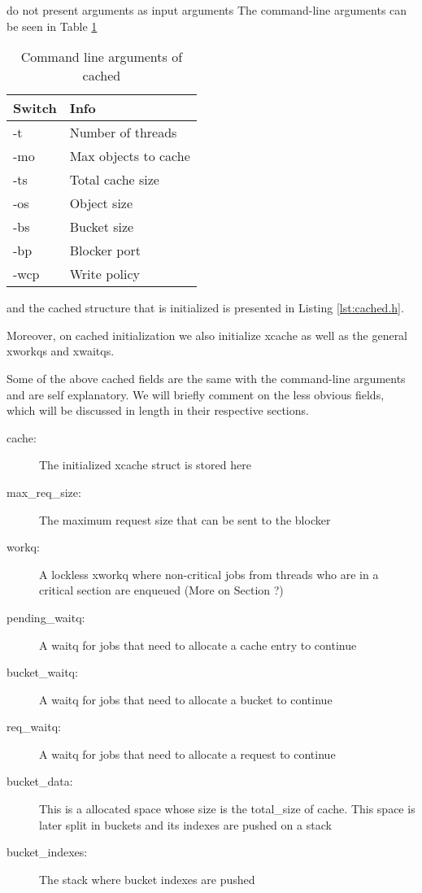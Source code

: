 \fixme do not present arguments as input arguments
The command-line arguments can be seen in Table \ref{tab:usage}

\begin{table}
	\centering
	\begin{tabular}{ | l | l | }
		\hline
		Switch & Info \\ \hline \hline
		-t & Number of threads \\ \hline
		-mo & Max objects to cache \\ \hline
		-ts & Total cache size \\ \hline
		-os & Object size \\ \hline
		-bs & Bucket size \\ \hline
		-bp & Blocker port \\ \hline
		-wcp & Write policy \\ \hline
	\end{tabular}
	\caption{Command line arguments of cached}
	\label{tab:usage}
\end{table}

and the cached structure that is initialized is presented in Listing 
\ref{lst:cached.h}. 


Moreover, on cached initialization we also initialize xcache as well as the 
general xworkqs and xwaitqs.

Some of the above cached fields are the same with the command-line arguments 
and are self explanatory. We will briefly comment on the less obvious fields, 
which will be discussed in length in their respective sections.

\begin{description}
	\item[cache:]
		The initialized xcache struct is stored here
	\item[max\_req\_size:]
		The maximum request size that can be sent to the blocker
	\item[workq:]
		A lockless xworkq where non-critical jobs from threads who are in a 
		critical section are enqueued (More on Section ?)
	\item[pending\_waitq:]
		A waitq for jobs that need to allocate a cache entry to continue
	\item[bucket\_waitq:]
		A waitq for jobs that need to allocate a bucket to continue
	\item[req\_waitq:]
		A waitq for jobs that need to allocate a request to continue
	\item[bucket\_data:]
		This is a allocated space whose size is the total\_size of 
		cache.  This space is later split in buckets and its indexes 
		are pushed on a stack
	\item[bucket\_indexes:]
		The stack where bucket indexes are pushed
\end{description}

